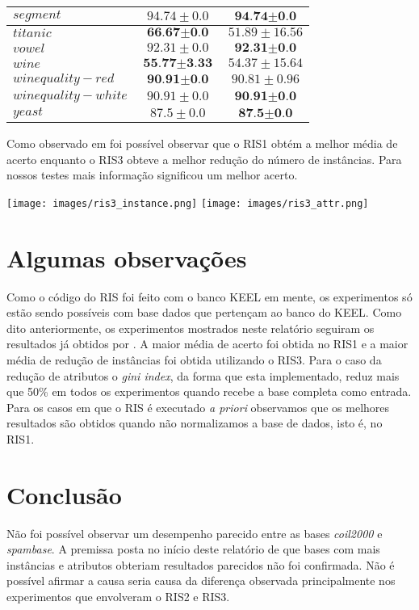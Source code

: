 \documentclass[a4paper, 12pt]{article}
\begin{document}
\begin{table}[h!]
\begin{center}
\begin{tabular}{l|c|c}
        \hline
        $segment$ & $94.74 \pm 0.0$  & $\textbf{94.74} \pm \textbf{0.0}$ \\
        \hline
        $titanic$ & $\textbf{66.67} \pm \textbf{0.0}$  & $51.89 \pm 16.56$ \\
        \hline
        $vowel$ & $92.31 \pm 0.0$  & $\textbf{92.31} \pm \textbf{0.0}$ \\
        \hline
        $wine$ & $\textbf{55.77} \pm \textbf{3.33}$  & $54.37 \pm 15.64$ \\
        \hline
        $winequality-red$ & $\textbf{90.91} \pm \textbf{0.0}$  & $90.81 \pm 0.96$ \\
        \hline
        $winequality-white$ & $90.91 \pm 0.0$  & $\textbf{90.91} \pm \textbf{0.0}$ \\
        \hline
        $yeast$ & $87.5 \pm 0.0$  & $\textbf{87.5} \pm \textbf{0.0}$ \\
    \end{tabular}
  \end{center}
\end{table}

Como observado em \cite{ris} foi possível observar que o RIS1 obtém a melhor média de acerto enquanto o RIS3 obteve a melhor redução do número de instâncias. Para nossos testes mais informação significou um melhor acerto.

\texttt{[image: images/ris3\_instance.png]}
\texttt{[image: images/ris3\_attr.png]}

\section{Algumas observações}
Como o código do RIS foi feito com o banco KEEL em mente, os experimentos só estão sendo possíveis com base dados que pertençam ao banco do KEEL.
Como dito anteriormente, os experimentos mostrados neste relatório seguiram os resultados já obtidos por \cite{ris}. A maior média de acerto foi obtida no RIS1 e a maior média de redução de instâncias foi obtida utilizando o RIS3. Para o caso da redução de atributos o \textit{gini index}, da forma que esta implementado, reduz mais que 50\% em todos os experimentos quando recebe a base completa como entrada. Para os casos em que o RIS é executado \textit{a priori} observamos que os melhores resultados são obtidos quando não normalizamos a base de dados, isto é, no RIS1.

\section{Conclusão}
Não foi possível observar um desempenho parecido entre as bases \textit{coil2000} e \textit{spambase}. A premissa posta no início deste relatório de que bases com mais instâncias e atributos obteriam resultados parecidos não foi confirmada. Não é possível afirmar a causa seria causa da diferença observada principalmente nos experimentos que envolveram o RIS2 e RIS3.
\printbibliography
\end{document}

